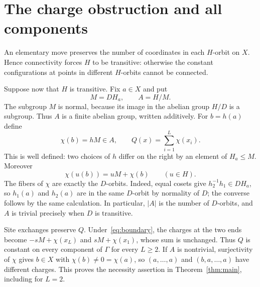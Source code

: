 \documentclass[11pt]{article}
\theoremstyle{remark}
\newcommand{\charge}{\chi}
\begin{document}
\section{The charge obstruction and all components}
An elementary move preserves the number of coordinates in each $H$-orbit on
$X$. Hence connectivity forces $H$ to be transitive: otherwise the constant
configurations at points in different $H$-orbits cannot be connected.

Suppose now that $H$ is transitive. Fix $a\in X$ and put
\[
 M=D H_a,\qquad A=H/M.
\]
The subgroup $M$ is normal, because its image in the abelian group $H/D$ is a
subgroup. Thus $A$ is a finite abelian group, written additively.
For $b=h(a)$ define
\begin{equation}\label{eq:charge}
 \charge(b)=hM\in A,\qquad Q(x)=\sum_{i=1}^{L}\charge(x_i).
\end{equation}
This is well defined: two choices of $h$ differ on the right by an element of
$H_a\leq M$. Moreover
\begin{equation}\label{eq:equivariance}
 \charge(u(b))=uM+\charge(b)\qquad(u\in H).
\end{equation}
The fibers of $\charge$ are exactly the $D$-orbits. Indeed, equal cosets give
$h_2^{-1}h_1\in D H_a$, so $h_1(a)$ and $h_2(a)$ are in the same $D$-orbit by
normality of $D$; the converse follows by the same calculation.
In particular, $|A|$ is the number of $D$-orbits, and $A$ is trivial precisely
when $D$ is transitive.

Site exchanges preserve $Q$. Under~\eqref{eq:boundary}, the charges at the two
ends become $-sM+\charge(x_L)$ and $sM+\charge(x_1)$, whose sum is unchanged.
Thus $Q$ is constant on every component of $\Gamma$ for every $L\geq2$.
If $A$ is nontrivial, surjectivity of $\charge$ gives $b\in X$ with
$\charge(b)\ne0=\charge(a)$, so $(a,\ldots,a)$ and $(b,a,\ldots,a)$ have
different charges. This proves the necessity assertion in
Theorem~\ref{thm:main}, including for $L=2$.
\end{document}
